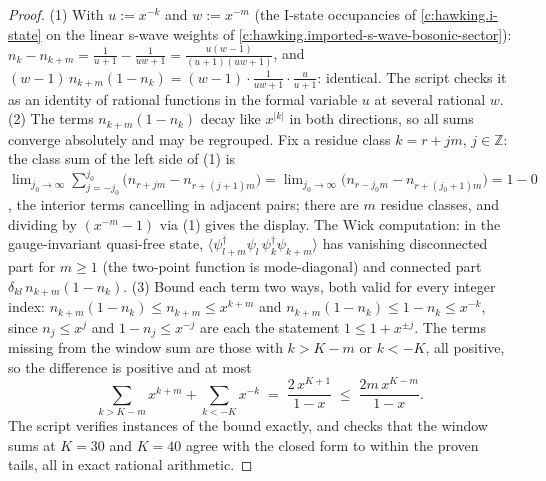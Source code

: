 \documentclass[11pt]{article}
\theoremstyle{definition}
\theoremstyle{plain}
\providecommand{\Z}{}\renewcommand{\Z}{\mathbb{Z}}
\begin{document}
\begin{proof}
(1) With $u := x^{-k}$ and $w := x^{-m}$ (the I-state occupancies of \ref{c:hawking.i-state} on the linear s-wave weights of \ref{c:hawking.imported-s-wave-bosonic-sector}): $n_k - n_{k+m} = \tfrac{1}{u+1} - \tfrac{1}{uw+1} = \tfrac{u(w-1)}{(u+1)(uw+1)}$, and $(w-1)\,n_{k+m}(1-n_k) = (w-1)\cdot\tfrac{1}{uw+1}\cdot\tfrac{u}{u+1}$: identical. The script checks it as an identity of rational functions in the formal variable $u$ at several rational $w$.
(2) The terms $n_{k+m}(1 - n_k)$ decay like $x^{|k|}$ in both directions, so all sums converge absolutely and may be regrouped. Fix a residue class $k = r + jm$, $j \in \Z$: the class sum of the left side of (1) is $\lim_{j_0 \to \infty}\sum_{j=-j_0}^{j_0}\bigl(n_{r+jm} - n_{r+(j+1)m}\bigr) = \lim_{j_0 \to \infty}\bigl(n_{r-j_0 m} - n_{r+(j_0+1)m}\bigr) = 1 - 0$, the interior terms cancelling in adjacent pairs; there are $m$ residue classes, and dividing by $(x^{-m}-1)$ via (1) gives the display. The Wick computation: in the gauge-invariant quasi-free state, $\langle \psi^\dagger_{l+m}\psi_l\,\psi^\dagger_k\psi_{k+m}\rangle$ has vanishing disconnected part for $m \ge 1$ (the two-point function is mode-diagonal) and connected part $\delta_{kl}\,n_{k+m}(1 - n_k)$.
(3) Bound each term two ways, both valid for every integer index: $n_{k+m}(1-n_k) \le n_{k+m} \le x^{k+m}$ and $n_{k+m}(1-n_k) \le 1 - n_k \le x^{-k}$, since $n_j \le x^j$ and $1 - n_j \le x^{-j}$ are each the statement $1 \le 1 + x^{\pm j}$. The terms missing from the window sum are those with $k > K - m$ or $k < -K$, all positive, so the difference is positive and at most
\[
\sum_{k > K-m} x^{k+m} + \sum_{k < -K} x^{-k} \;=\; \frac{2\,x^{K+1}}{1-x} \;\le\; \frac{2m\,x^{K-m}}{1-x}.
\]
The script verifies instances of the bound exactly, and checks that the window sums at $K = 30$ and $K = 40$ agree with the closed form to within the proven tails, all in exact rational arithmetic.

\end{proof}
\end{document}
